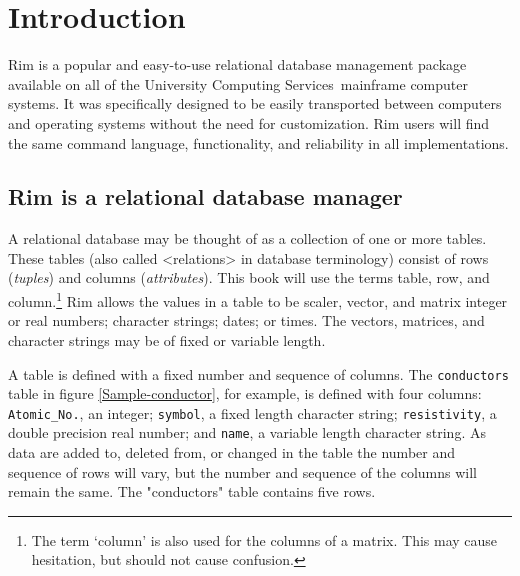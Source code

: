 \documentclass[11pt,a4paper]{report}
\def\UCS{University Computing Services}
\def\I{\index}
\begin{document}
%
%
\chapter{Introduction}
 
Rim is a popular and easy-to-use
relational database management package available
on all of the \UCS\ mainframe computer systems.
It was specifically designed to be easily transported between
computers and operating systems without the need for
customization.  Rim users will find the same command language,
functionality, and reliability in all implementations.
 
 
\section{Rim is a relational database manager}
\I{relational database}
A relational database may be thought of as a collection of
one or more tables.  These tables (also called <relations> in
database terminology) consist of rows (\emph{tuples}) and
columns (\emph{attributes}).
This book will use the terms table,
row, and column.\footnote{The term `column' is also used for
the columns of a matrix.  This may cause hesitation, but
should not cause confusion.}
Rim allows the values in a table to be
scaler, vector, and matrix integer or real numbers;
character strings; dates; or times.
The vectors, matrices, and character strings may be of fixed
or variable length.
 
A table is defined with a fixed number and sequence
of columns.  The \verb|conductors| table in
figure \ref{Sample-conductor}, for example,
is defined with four columns: \verb|Atomic_No.|, an integer;
\verb|symbol|, a fixed length character string;
\verb|resistivity|, a double precision real number;
and \verb|name|, a variable length character string.
As data are added to, deleted from, or changed in the
table the number and sequence of rows will vary, but
the number and sequence of the columns will remain the same.
The "conductors" table contains five rows.
 
\end{document}
